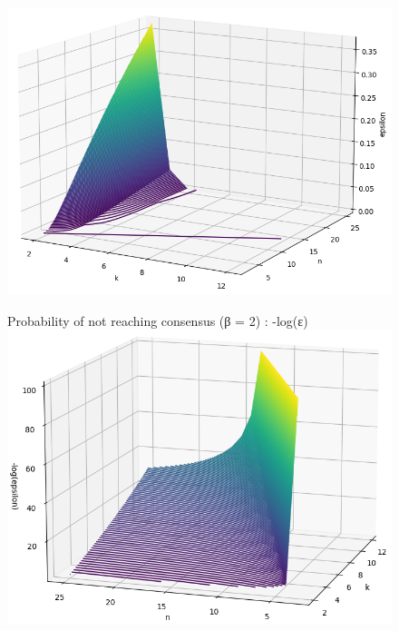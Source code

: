 \documentclass[11pt, twocolumn]{article}
\begin{document}
\begin{appendices}
\begin{figure}
        \centering
        \includegraphics[width=16.5cm]{images/smallnoconsensus.png}
    \end{figure}
    \begin{figure}
        Probability of not reaching consensus (β = 2) : -log(ε)
        \centering
        \includegraphics[width=16.5cm]{images/smalllognoconsensus.png}
    \end{figure}
\end{appendices}
\end{document}
